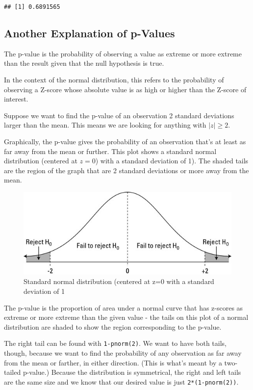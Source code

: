 \documentclass[
]{article}
\begin{document}
\begin{verbatim}
## [1] 0.6891565
\end{verbatim}

\hypertarget{another-explanation-of-p-values}{%
\subsection{Another Explanation of
p-Values}\label{another-explanation-of-p-values}}

The p-value is the probability of observing a value as extreme or more
extreme than the result given that the null hypothesis is true.

In the context of the normal distribution, this refers to the
probability of observing a Z-score whose absolute value is as high or
higher than the Z-score of interest.

Suppose we want to find the p-value of an observation 2 standard
deviations larger than the mean. This means we are looking for anything
with \(|z| \ge 2\).

Graphically, the p-value gives the probability of an observation that's
at least as far away from the mean or further. This plot shows a
standard normal distribution (centered at \(z = 0\)) with a standard
deviation of 1). The shaded tails are the region of the graph that are 2
standard deviations or more away from the mean.

\begin{figure}
\centering
\includegraphics{images/normal_distribution.jpg}
\caption{Standard normal distribution (centered at z=0 with a standard
deviation of 1}
\end{figure}

The p-value is the proportion of area under a normal curve that has
z-scores as extreme or more extreme than the given value - the tails on
this plot of a normal distribution are shaded to show the region
corresponding to the p-value.

The right tail can be found with \texttt{1-pnorm(2)}. We want to have
both tails, though, because we want to find the probability of any
observation as far away from the mean or farther, in either direction.
(This is what's meant by a two-tailed p-value.) Because the distribution
is symmetrical, the right and left tails are the same size and we know
that our desired value is just \texttt{2*(1-pnorm(2))}.
\end{document}
